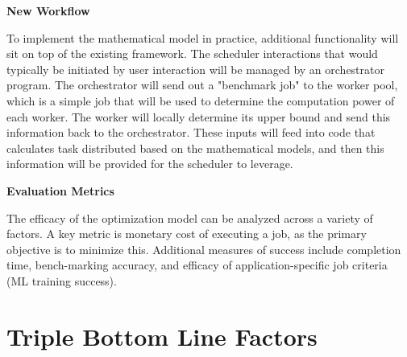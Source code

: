 \documentclass[../mthe-493-project-proposal.tex]{subfiles}
\begin{document}
    \textbf{New Workflow}

    To implement the mathematical model in practice, additional functionality will sit on top of the existing framework. The scheduler interactions that would typically be initiated by user interaction will be managed by an orchestrator program. The orchestrator will send out a "benchmark job" to the worker pool, which is a simple job that will be used to determine the computation power of each worker. The worker will locally determine its upper bound and send this information back to the orchestrator. These inputs will feed into code that calculates task distributed based on the mathematical models, and then this information will be provided for the scheduler to leverage.

    \textbf{Evaluation Metrics}

    The efficacy of the optimization model can be analyzed across a variety of factors. A key metric is monetary cost of executing a job, as the primary objective is to minimize this. Additional measures of success include completion time, bench-marking accuracy, and efficacy of application-specific job criteria (ML training success).

    \section{Triple Bottom Line Factors}
    \blindtext
\end{document}
